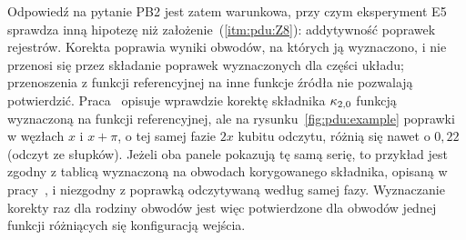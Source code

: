 Odpowiedź na pytanie PB2 jest zatem warunkowa, przy czym eksperyment E5 sprawdza inną hipotezę niż założenie~(\ref{itm:pdu:Z8}): addytywność poprawek rejestrów.
Korekta poprawia wyniki obwodów, na których ją wyznaczono, i nie przenosi się przez składanie poprawek wyznaczonych dla części układu; przenoszenia z funkcji referencyjnej na inne funkcje źródła nie pozwalają potwierdzić.
Praca~\cite{werner_experiment_driven_2022} opisuje wprawdzie korektę składnika $\kappa_{2,0}$ funkcją wyznaczoną na funkcji referencyjnej, ale na rysunku~\ref{fig:pdu:example} poprawki w węzłach $x$ i $x+\pi$, o tej samej fazie $2x$ kubitu odczytu, różnią się nawet o $0{,}22$ (odczyt ze słupków).
Jeżeli oba panele pokazują tę samą serię, to przykład jest zgodny z tablicą wyznaczoną na obwodach korygowanego składnika, opisaną w pracy~\cite{werner_magisterka_2022}, i niezgodny z poprawką odczytywaną według samej fazy.
Wyznaczanie korekty raz dla rodziny obwodów jest więc potwierdzone dla obwodów jednej funkcji różniących się konfiguracją wejścia.

